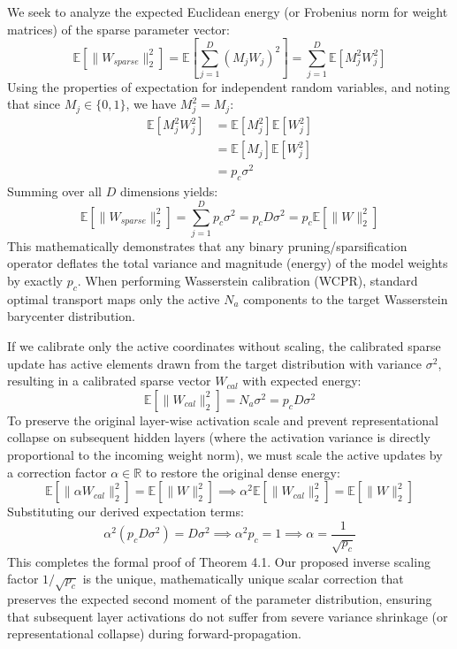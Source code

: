 \documentclass{article}
\theoremstyle{plain}
\theoremstyle{definition}
\theoremstyle{remark}
\begin{document}
We seek to analyze the expected Euclidean energy (or Frobenius norm for weight matrices) of the sparse parameter vector:
\begin{equation}
    \mathbb{E}[\|W_{sparse}\|_2^2] = \mathbb{E} \left[ \sum_{j=1}^D (M_j W_j)^2 \right] = \sum_{j=1}^D \mathbb{E}[M_j^2 W_j^2]
\end{equation}
Using the properties of expectation for independent random variables, and noting that since $M_j \in \{0,1\}$, we have $M_j^2 = M_j$:
\begin{align}
    \mathbb{E}[M_j^2 W_j^2] &= \mathbb{E}[M_j^2] \mathbb{E}[W_j^2] \nonumber \\
    &= \mathbb{E}[M_j] \mathbb{E}[W_j^2] \nonumber \\
    &= p_c \sigma^2
\end{align}
Summing over all $D$ dimensions yields:
\begin{equation}
    \mathbb{E}[\|W_{sparse}\|_2^2] = \sum_{j=1}^D p_c \sigma^2 = p_c D \sigma^2 = p_c \mathbb{E}[\|W\|_2^2]
\end{equation}
This mathematically demonstrates that any binary pruning/sparsification operator deflates the total variance and magnitude (energy) of the model weights by exactly $p_c$. When performing Wasserstein calibration (WCPR), standard optimal transport maps only the active $N_a$ components to the target Wasserstein barycenter distribution. 

If we calibrate only the active coordinates without scaling, the calibrated sparse update has active elements drawn from the target distribution with variance $\sigma^2$, resulting in a calibrated sparse vector $W_{cal}$ with expected energy:
\begin{equation}
    \mathbb{E}[\|W_{cal}\|_2^2] = N_a \sigma^2 = p_c D \sigma^2
\end{equation}
To preserve the original layer-wise activation scale and prevent representational collapse on subsequent hidden layers (where the activation variance is directly proportional to the incoming weight norm), we must scale the active updates by a correction factor $\alpha \in \mathbb{R}$ to restore the original dense energy:
\begin{equation}
    \mathbb{E}[\|\alpha W_{cal}\|_2^2] = \mathbb{E}[\|W\|_2^2] \implies \alpha^2 \mathbb{E}[\|W_{cal}\|_2^2] = \mathbb{E}[\|W\|_2^2]
\end{equation}
Substituting our derived expectation terms:
\begin{equation}
    \alpha^2 (p_c D \sigma^2) = D \sigma^2 \implies \alpha^2 p_c = 1 \implies \alpha = \frac{1}{\sqrt{p_c}}
\end{equation}
This completes the formal proof of Theorem 4.1. Our proposed inverse scaling factor $1/\sqrt{p_c}$ is the unique, mathematically unique scalar correction that preserves the expected second moment of the parameter distribution, ensuring that subsequent layer activations do not suffer from severe variance shrinkage (or representational collapse) during forward-propagation.
\end{document}
